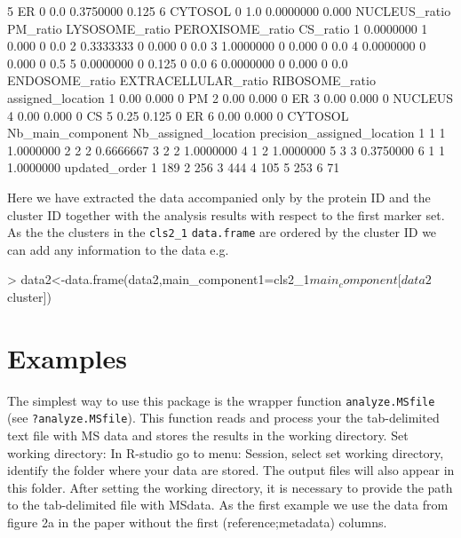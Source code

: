\documentclass[a4paper]{article}
\numberwithin{equation}{subsection}
\begin{document}
\begin{Schunk}
\begin{Soutput}
5             ER           0           0.0 0.3750000               0.125
6        CYTOSOL           0           1.0 0.0000000               0.000
  NUCLEUS_ratio PM_ratio LYSOSOME_ratio PEROXISOME_ratio CS_ratio
1     0.0000000        1          0.000                0      0.0
2     0.3333333        0          0.000                0      0.0
3     1.0000000        0          0.000                0      0.0
4     0.0000000        0          0.000                0      0.5
5     0.0000000        0          0.125                0      0.0
6     0.0000000        0          0.000                0      0.0
  ENDOSOME_ratio EXTRACELLULAR_ratio RIBOSOME_ratio assigned_location
1           0.00               0.000              0                PM
2           0.00               0.000              0                ER
3           0.00               0.000              0           NUCLEUS
4           0.00               0.000              0                CS
5           0.25               0.125              0                ER
6           0.00               0.000              0           CYTOSOL
  Nb_main_component Nb_assigned_location precision_assigned_location
1                 1                    1                   1.0000000
2                 2                    2                   0.6666667
3                 2                    2                   1.0000000
4                 1                    2                   1.0000000
5                 3                    3                   0.3750000
6                 1                    1                   1.0000000
  updated_order
1           189
2           256
3           444
4           105
5           253
6            71
\end{Soutput}
\end{Schunk}
\normalsize
Here we have extracted the data accompanied only by the protein ID and
the cluster ID together with the analysis results with respect to the
first marker set.
As the the clusters in the \texttt{cls2\_1} \texttt{data.frame} are
ordered by the cluster ID we can add any information to the data e.g.
\scriptsize
\begin{Schunk}
\begin{Sinput}
> data2<-data.frame(data2,main_component1=cls2_1$main_component[data2$cluster])
\end{Sinput}
\end{Schunk}
\normalsize
\section{Examples}
\label{examp_s}
The simplest way to use this package is the wrapper function
\texttt{analyze.MSfile} (see \texttt{?analyze.MSfile}). This function
reads and process your the tab-delimited text file with MS data and
stores the results in the working directory.
Set working directory: In R-studio go to menu: Session, select set working directory, identify the folder where your data are stored. The output files will also appear in this folder.
After setting the working directory, it is necessary to provide the
path to the tab-delimited file with MSdata. As the first example we use the data from figure 2a in the paper without the first
(reference;metadata) columns.
\end{document}
